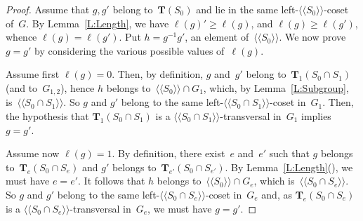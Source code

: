 \documentclass{amsart}
\numberwithin{equation}{section}
\theoremstyle{plain}
\theoremstyle{definition}
\let\ge=\geqslant
\newcounter{ITEM}
\begin{document}
\begin{proof} 
Assume that ${g}, {g}'$ belong to~${\boldsymbol{T}}({S}_0)$ and lie in the same left-${\langle\!\langle{{{S}_0}}\rangle\!\rangle}$-coset of~${G}$. By Lemma~\ref{L:Length}, we have ${\ell({g})}' \ge {\ell({g})}$, and ${\ell({g})} \ge {\ell({{g}'})}$, whence ${\ell({g})} = {\ell({{g}'})}$. Put ${h} = {g}{^{-1}} {g}'$, an element of~${\langle\!\langle{{{S}_0}}\rangle\!\rangle}$. We now prove ${g} = {g}'$ by considering the various possible values of~${\ell({g})}$. 

Assume first ${\ell({g})} = 0$. Then, by definition, ${g}$ and~${g}'$ belong to~${\boldsymbol{T}}_1({S}_0 \cap {S}_1)$ (and to~${G}_{1,2}$), hence ${h}$ belongs to~${\langle\!\langle{{{S}_0}}\rangle\!\rangle} \cap {G}_1$, which, by Lemma~\ref{L:Subgroup}, is~${\langle\!\langle{{{S}_0 \cap {S}_1}}\rangle\!\rangle}$. So ${g}$ and ${g}'$ belong to the same left-${\langle\!\langle{{{S}_0 \cap {S}_1}}\rangle\!\rangle}$-coset in~${G}_1$. Then, the hypothesis that ${\boldsymbol{T}}_1({S}_0 \cap {S}_1)$ is a ${\langle\!\langle{{{S}_0 \cap {S}_1}}\rangle\!\rangle}$-transversal in~${G}_1$ implies~${g} = {g}'$.

Assume now ${\ell({g})} = 1$. By definition, there exist~${e}$ and~${e}'$ such that ${g}$ belongs to~${\boldsymbol{T}}_{e}({S}_0 \cap {S}_{e})$ and ${g}'$ belongs to~${\boldsymbol{T}}_{{e}'}({S}_0 \cap {S}_{{e}'})$. By Lemma~\ref{L:Length}{\setcounter{ITEM}{2}\leavevmode\hbox{\rm()}}, we must have ${e} = {e}'$. It follows that ${h}$ belongs to~${\langle\!\langle{{{S}_0}}\rangle\!\rangle} \cap {G}_{e}$, which is~${\langle\!\langle{{{S}_0 \cap {S}_{e}}}\rangle\!\rangle}$. So ${g}$ and ${g}'$ belong to the same left-${\langle\!\langle{{{S}_0 \cap {S}_{e}}}\rangle\!\rangle}$-coset in~${G}_{e}$ and, as ${\boldsymbol{T}}_{e}({S}_0 \cap {S}_{e})$ is a ${\langle\!\langle{{{S}_0 \cap {S}_{e}}}\rangle\!\rangle}$-transversal in~${G}_{e}$, we must have ${g} = {g}'$.


\end{proof}
\end{document}
